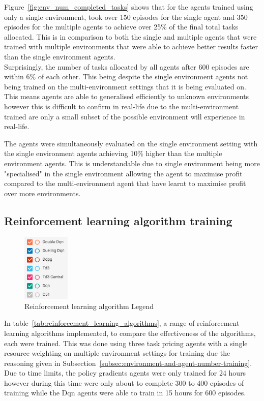 Figure~\ref{fig:env_num_completed_tasks} shows that for the agents trained using only a single environment, took
over 150 episodes for the single agent and 350 episodes for the multiple agents to achieve over 25\% of the final total
tasks allocated. This is in comparison to both the single and multiple agents that were trained with multiple
environments that were able to achieve better results faster than the single environment agents. \\
Surprisingly, the number of tasks allocated by all agents after 600 episodes are within 6\% of each other. This being
despite the single environment agents not being trained on the multi-environment settings that it is being evaluated on.
This means agents are able to generalised efficiently to unknown environments however this is difficult to confirm in
real-life due to the multi-environment trained are only a small subset of the possible environment will experience in
real-life.

The agents were simultaneously evaluated on the single environment setting with the single environment agents
achieving 10\% higher than the multiple environment agents. This is understandable due to single environment being
more "specialised" in the single environment allowing the agent to maximise profit compared to the multi-environment
agent that have learnt to maximise profit over more environments.

\subsection{Reinforcement learning algorithm training}
\label{subsec:reinforcement-learning-algorithm-training}

\begin{figure}
    \includegraphics[width=0.2\textwidth]{figures/5_evaluation_figs/algo_training_fig/legend.png}
    \caption{Reinforcement learning algorithm Legend}
    \label{fig:algo-training-legend}
\end{figure}

In table~\ref{tab:reinforcement_learning_algorithms}, a range of reinforcement learning algorithms implemented,
to compare the effectiveness of the algorithms, each were trained. This was done using three task pricing agents with
a single resource weighting on multiple environment settings for training due the reasoning given in
Subsection~\ref{subsec:environment-and-agent-number-training}. Due to time limits, the policy gradients agents were
only trained for 24 hours however during this time were only about to complete 300 to 400 episodes of training while
the Dqn agents were able to train in 15 hours for 600 episodes.

